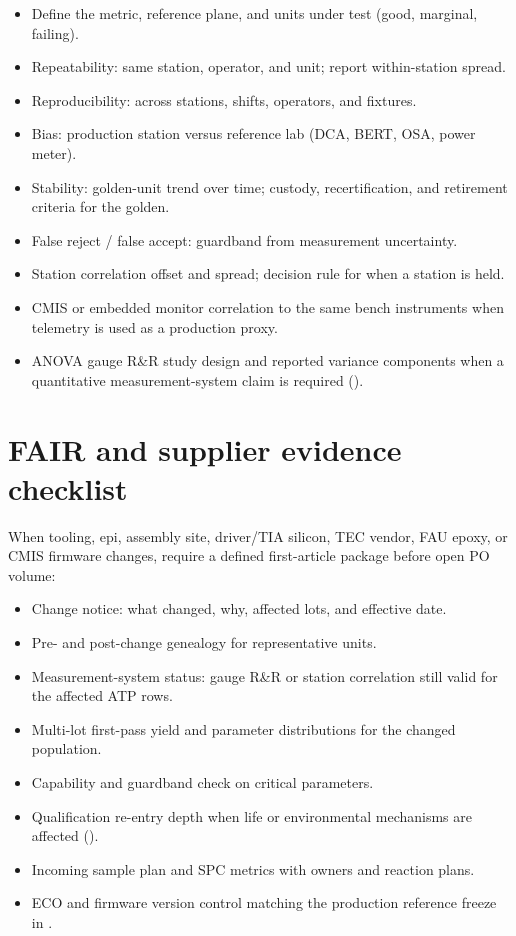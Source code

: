 \begin{itemize}
\item Define the metric, reference plane, and units under test (good, marginal,
      failing).
\item Repeatability: same station, operator, and unit; report within-station
      spread.
\item Reproducibility: across stations, shifts, operators, and fixtures.
\item Bias: production station versus reference lab (DCA, BERT, OSA, power
      meter).
\item Stability: golden-unit trend over time; custody, recertification, and
      retirement criteria for the golden.
\item False reject / false accept: guardband from measurement uncertainty.
\item Station correlation offset and spread; decision rule for when a station
      is held.
\item CMIS or embedded monitor correlation to the same bench instruments when
      telemetry is used as a production proxy.
\item ANOVA gauge R\&R study design and reported variance components when a
      quantitative measurement-system claim is required ().
\end{itemize}

\section{FAIR and supplier evidence checklist}
\label{sec:mfg-fair-checklist}

When tooling, epi, assembly site, driver/TIA silicon, TEC vendor, FAU epoxy, or
CMIS firmware changes, require a defined first-article package before open PO
volume:

\begin{itemize}
\item Change notice: what changed, why, affected lots, and effective date.
\item Pre- and post-change genealogy for representative units.
\item Measurement-system status: gauge R\&R or station correlation still valid
      for the affected ATP rows.
\item Multi-lot first-pass yield and parameter distributions for the changed
      population.
\item Capability and guardband check on critical parameters.
\item Qualification re-entry depth when life or environmental mechanisms are
      affected ().
\item Incoming sample plan and SPC metrics with owners and reaction plans.
\item ECO and firmware version control matching the production reference freeze
      in .
\end{itemize}


